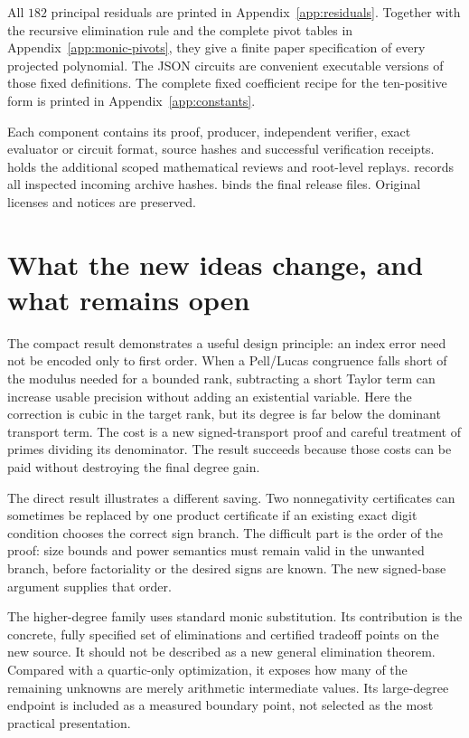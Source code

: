 \documentclass[11pt,letterpaper]{article}
\theoremstyle{definition}
\theoremstyle{remark}
\begin{document}
All $182$ principal residuals are printed in Appendix~\ref{app:residuals}.
Together with the recursive elimination rule and the complete pivot tables
in Appendix~\ref{app:monic-pivots}, they give a finite paper specification of every
projected polynomial.  The JSON circuits are convenient executable versions
of those fixed definitions.  The complete fixed coefficient recipe for the
ten-positive form is printed in Appendix~\ref{app:constants}.

Each component contains its proof, producer, independent verifier, exact
evaluator or circuit format, source hashes and successful verification
receipts.   holds the additional scoped mathematical reviews
and root-level replays.   records all inspected
incoming archive hashes.   binds the final release
files.  Original licenses and notices are preserved.

\section{What the new ideas change, and what remains open}
\label{sec:outlook}

The compact result demonstrates a useful design principle: an index error
need not be encoded only to first order.  When a Pell/Lucas congruence falls
short of the modulus needed for a bounded rank, subtracting a short Taylor
term can increase usable precision without adding an existential variable.
Here the correction is cubic in the target rank, but its degree is far below
the dominant transport term.  The cost is a new signed-transport proof and
careful treatment of primes dividing its denominator.  The result succeeds
because those costs can be paid without destroying the final degree gain.

The direct result illustrates a different saving.  Two nonnegativity certificates
can sometimes be replaced by one product certificate if an existing exact
digit condition chooses the correct sign branch.  The difficult part is
the order of the proof: size bounds and power semantics must remain valid
in the unwanted branch, before factoriality or the desired signs are known.
The new signed-base argument supplies that order.

The higher-degree family uses standard monic substitution.  Its contribution
is the concrete, fully specified set of eliminations and certified tradeoff
points on the new source.  It should not be described as a new general
elimination theorem.  Compared with a quartic-only optimization, it exposes
how many of the remaining unknowns are merely arithmetic intermediate
values.  Its large-degree endpoint is included as a measured boundary point,
not selected as the most practical presentation.
\end{document}
